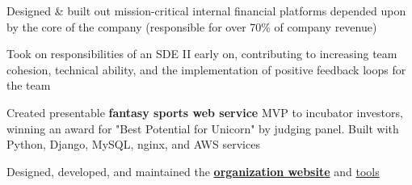 \documentclass[]{two-column-resume}
\begin{document}
\begin{minipage}[t]{0.65\textwidth}

\vspace{\topsep} %

\begin{tightemize}
\item Designed \& built out mission-critical internal financial platforms depended upon by the core of the company (responsible for over 70\% of company revenue)
\item Took on responsibilities of an SDE II early on, contributing to increasing team cohesion, technical ability, and the implementation of positive feedback loops for the team
\end{tightemize}
\sectionsep


\vspace{0.9em} %

\begin{tightemize}
\item Created presentable {\bf fantasy sports web service} MVP to
incubator investors, winning an award for "Best Potential for Unicorn"
by judging panel. Built with Python, Django, MySQL, nginx, and AWS services
\end{tightemize}
\sectionsep


\vspace{\topsep} %

\begin{tightemize}
\item Designed, developed, and maintained the 
{\bf \href{https://www.skullhouse.nyc}{organization website}} and 
\href{https://github.com/JasonYao/Bobst-Room-Automator}{tools}
\end{tightemize}
\sectionsep



\end{minipage}
\end{document}
